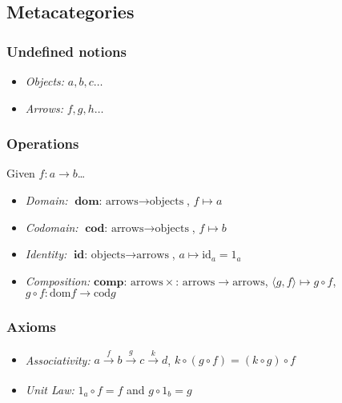 \subsection{Metacategories}\label{metacategory}

\subsubsection{Undefined notions}
\begin{itemize}
  \item \emph{Objects:} $a,b,c\dots$
  \item \emph{Arrows:} $f,g,h\dots$
\end{itemize}

\subsubsection{Operations}
Given $f: a \rightarrow b$\dots
\begin{itemize}
  \item \emph{Domain:} $\textbf{dom}\textrm{: arrows} \rightarrow \textrm{objects}$, $f \mapsto a$
  \item \emph{Codomain:} $\textbf{cod}\textrm{: arrows} \rightarrow \textrm{objects}$, $f \mapsto b$
  \item \emph{Identity:} $\textbf{id}\textrm{: objects} \rightarrow \textrm{arrows}$, $a \mapsto \textrm{id}_a = 1_a$
  \item \emph{Composition:} $\textbf{comp}\textrm{: arrows} \times \textrm{: arrows} \rightarrow \textrm{arrows}$, $\langle g, f \rangle \mapsto g \circ f$, \newline $g \circ f: \textrm{dom} f \rightarrow \textrm{cod} g$
\end{itemize}
\begin{figure}[!h]
\centering

\end{figure}

\subsubsection{Axioms}
\begin{itemize}
  \item \emph{Associativity:} $a \xrightarrow[]{f} b \xrightarrow[]{g} c \xrightarrow[]{k} d$, $k \circ (g \circ f) = (k \circ g) \circ f$
  \begin{figure}[!h]
  \centering
  
  \end{figure}
  \item \emph{Unit Law:} $1_a \circ f = f$ and $g \circ 1_b = g$
  \begin{figure}[!h]
  \centering
  
  \end{figure}
\end{itemize}